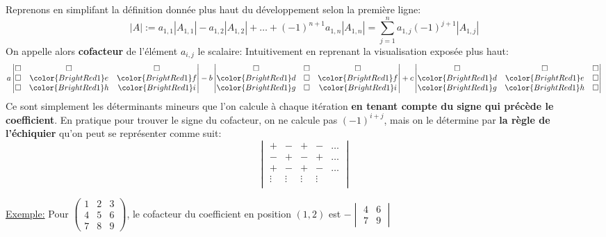 Reprenons en simplifant la définition donnée plus haut du développement selon la première ligne:
\[
   |A| := a_{1, 1}|A_{1, 1}| - a_{1, 2}|A_{1, 2}| + \ldots + (-1)^{n+1}a_{1, n}|A_{1, n}| = \sum_{j=1}^{n}a_{1, j}(-1)^{j+1}|A_{1, j}|
\]
On appelle alors \textbf{cofacteur} de l'élément \(a_{i, j}\) le scalaire:
Intuitivement en reprenant la visualisation exposée plus haut:
\[
   a \begin{vmatrix} \square & \square & \square \\ \square & \color{BrightRed1}e & \color{BrightRed1}f \\ \square & \color{BrightRed1}h & \color{BrightRed1}i \end{vmatrix} - 
   b \begin{vmatrix} \square & \square & \square \\ \color{BrightRed1}d & \square & \color{BrightRed1}f \\ \color{BrightRed1}g & \square & \color{BrightRed1}i \end{vmatrix} + 
   c \begin{vmatrix} \square & \square & \square \\ \color{BrightRed1}d & \color{BrightRed1}e & \square \\ \color{BrightRed1}g & \color{BrightRed1}h & \square \end{vmatrix}  
\]
Ce sont simplement les déterminants mineurs que l'on calcule à chaque itération \textbf{en tenant compte du signe qui précède le coefficient}.\+
En pratique pour trouver le signe du cofacteur, on ne calcule pas \((-1)^{i + j}\), mais on le détermine par \textbf{la règle de l'échiquier} qu'on peut se représenter comme suit:
\[
   \begin{vmatrix} + & - & + & - & \ldots \\ - & + & - & + &\ldots \\ + & - & + & - &\ldots \\ \vdots & \vdots & \vdots & \vdots \\\end{vmatrix}
\]

\underline{Exemple:} Pour \(\begin{pmatrix}
   1 & 2 & 3 \\ 4 & 5 & 6 \\ 7 & 8 & 9
\end{pmatrix}\), le cofacteur du coefficient en position \((1, 2)\) est 
\(- \begin{vmatrix} 4 & 6 \\ 7 & 9\end{vmatrix} \)

